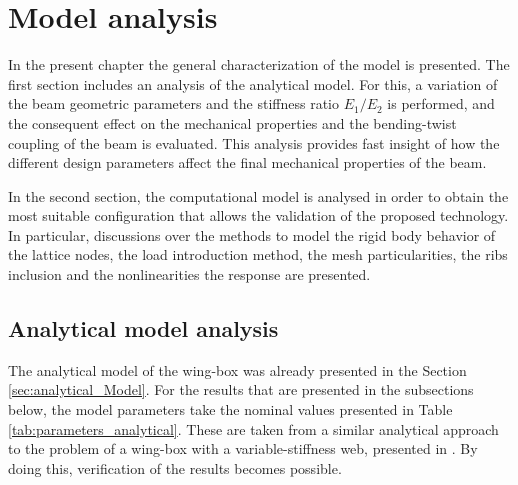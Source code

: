 \chapter{Model analysis} \label{chap:Results_model}
%

In the present chapter the general characterization of the model is presented. The first section includes an analysis of the analytical model. For this, a variation of the beam geometric parameters and the stiffness ratio $E_1/E_2$ is performed, and the consequent effect on the mechanical properties and the bending-twist coupling of the beam is evaluated. This analysis provides fast insight of how the different design parameters affect the final mechanical properties of the beam.

In the second section, the computational model is analysed in order to obtain the most suitable configuration that allows the validation of the proposed technology. In particular, discussions over the methods to model the rigid body behavior of the lattice nodes, the load introduction method, the mesh particularities, the ribs inclusion and the nonlinearities the response are presented. 

\section{Analytical model analysis} \label{sec:analyticalParametricStudy_results_model}

  The analytical model of the wing-box was already presented in the Section \ref{sec:analytical_Model}. For the results that are presented in the subsections below, the model parameters take the nominal values presented in Table \ref{tab:parameters_analytical}. These are taken from a similar analytical approach to the problem of a wing-box with a variable-stiffness web, presented in \cite{Raither2013a}. By doing this, verification of the results becomes possible.

